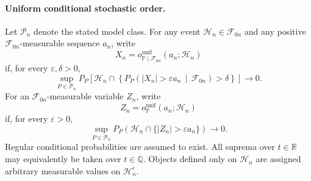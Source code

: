 \documentclass[11pt]{article}
\theoremstyle{definition}
\newcommand{\1}{\mathbf 1}\newcommand{\op}{\operatorname}
\begin{document}
\paragraph{Uniform conditional stochastic order.}
Let $\mathcal P_n$ denote the stated model class. For any event
$\mathcal H_n\in\mathcal F_{0n}$ and any positive
$\mathcal F_{0n}$-measurable sequence $a_n$, write
\[
X_n
=
o_{\mathbb P\mid\mathcal F_{0n}}^{\mathrm{unif}}
(a_n;\mathcal H_n)
\]
if, for every $\varepsilon,\delta>0$,
\begin{equation}
\sup_{P\in\mathcal P_n}
P_P\!\left[
\mathcal H_n\cap
\left\{
P_P\!\left(
|X_n|>\varepsilon a_n
\,\middle|\,
\mathcal F_{0n}
\right)>\delta
\right\}
\right]
\longrightarrow0.
\label{eq:uniform-conditional-op}
\end{equation}
For an $\mathcal F_{0n}$-measurable variable $Z_n$, write
\[
Z_n=o_{\mathbb P}^{\mathrm{unif}}(a_n;\mathcal H_n)
\]
if, for every $\varepsilon>0$,
\begin{equation}
\sup_{P\in\mathcal P_n}
P_P\!\left(
\mathcal H_n\cap
\{|Z_n|>\varepsilon a_n\}
\right)
\longrightarrow0.
\label{eq:uniform-design-op}
\end{equation}
Regular conditional probabilities are assumed to exist. All suprema
over $t\in\mathbb R$ may equivalently be taken over $t\in\mathbb Q$.
Objects defined only on $\mathcal H_n$ are assigned arbitrary
measurable values on $\mathcal H_n^c$.
\end{document}
